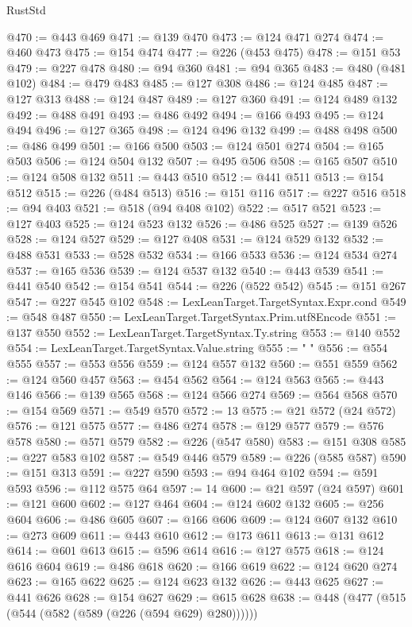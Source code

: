 \begin{lexlean}{RustStd}
\begin{coremodule}
{\begin{coremodule}
{{{{{{{{{{{{{{{{{{{{{{{{{{{{{{{{{{{{{@470 := @443 @469
@471 := @139 @470
@473 := @124 @471 @274
@474 := @460 @473
@475 := @154 @474
@477 := @226 (@453 @475)
@478 := @151 @53
@479 := @227 @478
@480 := @94 @360
@481 := @94 @365
@483 := @480 (@481 @102)
@484 := @479 @483
@485 := @127 @308
@486 := @124 @485
@487 := @127 @313
@488 := @124 @487
@489 := @127 @360
@491 := @124 @489 @132
@492 := @488 @491
@493 := @486 @492
@494 := @166 @493
@495 := @124 @494
@496 := @127 @365
@498 := @124 @496 @132
@499 := @488 @498
@500 := @486 @499
@501 := @166 @500
@503 := @124 @501 @274
@504 := @165 @503
@506 := @124 @504 @132
@507 := @495 @506
@508 := @165 @507
@510 := @124 @508 @132
@511 := @443 @510
@512 := @441 @511
@513 := @154 @512
@515 := @226 (@484 @513)
@516 := @151 @116
@517 := @227 @516
@518 := @94 @403
@521 := @518 (@94 @408 @102)
@522 := @517 @521
@523 := @127 @403
@525 := @124 @523 @132
@526 := @486 @525
@527 := @139 @526
@528 := @124 @527
@529 := @127 @408
@531 := @124 @529 @132
@532 := @488 @531
@533 := @528 @532
@534 := @166 @533
@536 := @124 @534 @274
@537 := @165 @536
@539 := @124 @537 @132
@540 := @443 @539
@541 := @441 @540
@542 := @154 @541
@544 := @226 (@522 @542)
@545 := @151 @267
@547 := @227 @545 @102
@548 := LexLeanTarget.TargetSyntax.Expr.cond
@549 := @548 @487
@550 := LexLeanTarget.TargetSyntax.Prim.utf8Encode
@551 := @137 @550
@552 := LexLeanTarget.TargetSyntax.Ty.string
@553 := @140 @552
@554 := LexLeanTarget.TargetSyntax.Value.string
@555 := " "
@556 := @554 @555
@557 := @553 @556
@559 := @124 @557 @132
@560 := @551 @559
@562 := @124 @560 @457
@563 := @454 @562
@564 := @124 @563
@565 := @443 @146
@566 := @139 @565
@568 := @124 @566 @274
@569 := @564 @568
@570 := @154 @569
@571 := @549 @570
@572 := 13
@575 := @21 @572 (@24 @572)
@576 := @121 @575
@577 := @486 @274
@578 := @129 @577
@579 := @576 @578
@580 := @571 @579
@582 := @226 (@547 @580)
@583 := @151 @308
@585 := @227 @583 @102
@587 := @549 @446 @579
@589 := @226 (@585 @587)
@590 := @151 @313
@591 := @227 @590
@593 := @94 @464 @102
@594 := @591 @593
@596 := @112 @575 @64
@597 := 14
@600 := @21 @597 (@24 @597)
@601 := @121 @600
@602 := @127 @464
@604 := @124 @602 @132
@605 := @256 @604
@606 := @486 @605
@607 := @166 @606
@609 := @124 @607 @132
@610 := @273 @609
@611 := @443 @610
@612 := @173 @611
@613 := @131 @612
@614 := @601 @613
@615 := @596 @614
@616 := @127 @575
@618 := @124 @616 @604
@619 := @486 @618
@620 := @166 @619
@622 := @124 @620 @274
@623 := @165 @622
@625 := @124 @623 @132
@626 := @443 @625
@627 := @441 @626
@628 := @154 @627
@629 := @615 @628
@638 := @448 (@477 (@515 (@544 (@582 (@589 (@226 (@594 @629) @280))))))
}}}}}}}}}}}}}}}}}}}}}}}}}}}}}}}}}}}}}
\end{coremodule}}
\end{coremodule}
\end{lexlean}

